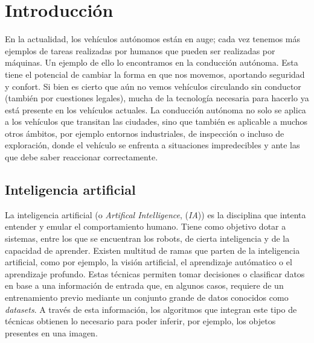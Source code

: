 \chapter{Introducción}
\label{cap:capitulo1}
\setcounter{page}{1}

En la actualidad, los vehículos autónomos están en auge; cada vez tenemos más ejemplos de tareas realizadas por humanos que pueden ser realizadas por máquinas. Un ejemplo de ello lo encontramos en la conducción autónoma. Esta tiene el potencial de cambiar la forma en que nos movemos, aportando seguridad y confort. Si bien es cierto que aún no vemos vehículos circulando sin conductor (también por cuestiones legales), mucha de la tecnología necesaria para hacerlo ya está presente en los vehículos actuales. La conducción autónoma no solo se aplica a los vehículos que transitan las ciudades, sino que también es aplicable a muchos otros ámbitos, por ejemplo entornos industriales, de inspección o incluso de exploración, donde el vehículo se enfrenta a situaciones impredecibles y ante las que debe saber reaccionar correctamente.\\

\section{Inteligencia artificial}
\label{sec:ia}
La inteligencia artificial (o \textit{Artifical Intelligence}, (\textit{IA})) es la disciplina que intenta entender y emular el comportamiento humano. Tiene como objetivo dotar a sistemas, entre los que se encuentran los robots, de cierta inteligencia y de la capacidad de aprender. Existen multitud de ramas que parten de la inteligencia artificial, como por ejemplo, la visión artificial, el aprendizaje autómatico o el aprendizaje profundo. Estas técnicas permiten tomar decisiones o clasificar datos en base a una información de entrada que, en algunos casos, requiere de un entrenamiento previo mediante un conjunto grande de datos conocidos como \textit{datasets}. A través de esta información, los algoritmos que integran este tipo de técnicas obtienen lo necesario para poder inferir, por ejemplo, los objetos presentes en una imagen.\\  

